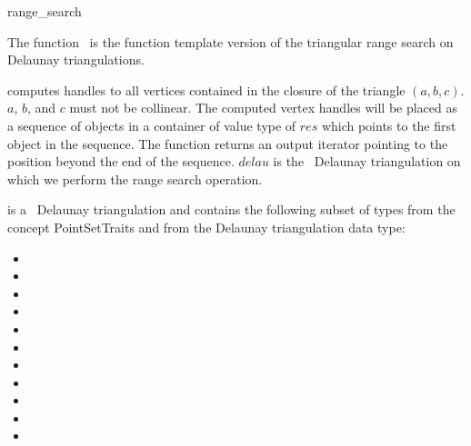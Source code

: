 \begin{ccRefFunction}{range_search}

\ccDefinition  

The function \ccRefName\ is the function template version of the triangular range search on Delaunay
triangulations.



{computes handles to all vertices contained in the closure of the triangle $(a,b,c)$.\\
\ccPrecond $a$, $b$, and $c$ must not be collinear. 
The computed vertex handles will be placed as a sequence of objects in a container of value type
of $res$
which points to the first object in the sequence. The function
returns an output iterator pointing to the position beyond the end
of the sequence. 
$delau$ is the \cgal\ Delaunay triangulation on which we perform the range search operation.}

 is a \cgal\ Delaunay triangulation and contains the following subset of types from the concept PointSetTraits and from
the Delaunay triangulation data type:
\begin{itemize}
  \item {} 
  \item {}
  \item {} 
  \item {}   
  \item {} 
  \item {}  
  \item {}  
  \item {} 
  \item {} 
  \item {} 
  \item {}  
\end{itemize}

\end{ccRefFunction}



